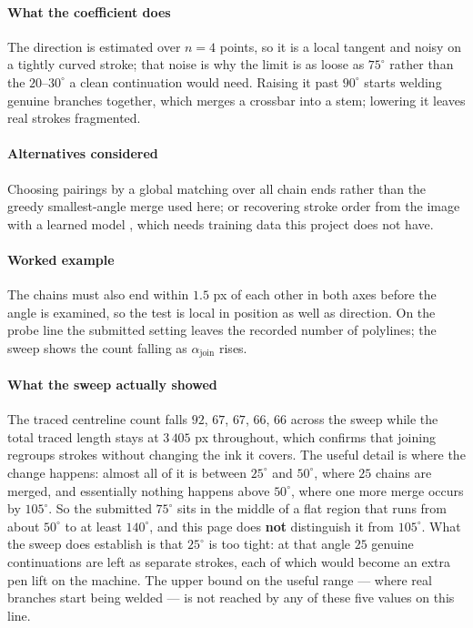 \paragraph{What the coefficient does}

The direction is estimated over $n = 4$ points, so it is a local tangent and noisy on a tightly curved stroke; that noise is why the limit is as loose as $75^\circ$ rather than the $20$--$30^\circ$ a clean continuation would need. Raising it past $90^\circ$ starts welding genuine branches together, which merges a crossbar into a stem; lowering it leaves real strokes fragmented.

\paragraph{Alternatives considered}

Choosing pairings by a global matching over all chain ends rather than the greedy smallest-angle merge used here; or recovering stroke order from the image with a learned model \cite{plamondon2000}, which needs training data this project does not have.

\paragraph{Worked example}

The chains must also end within $1.5$ px of each other in both axes before the angle is examined, so the test is local in position as well as direction. On the probe line the submitted setting leaves the recorded number of polylines; the sweep shows the count falling as $\alpha_{\text{join}}$ rises.

\paragraph{What the sweep actually showed}

The traced centreline count falls $92$, $67$, $67$, $66$, $66$ across the sweep while the total traced length stays at $3\,405$ px throughout, which confirms that joining regroups strokes without changing the ink it covers. The useful detail is where the change happens: almost all of it is between $25^\circ$ and $50^\circ$, where $25$ chains are merged, and essentially nothing happens above $50^\circ$, where one more merge occurs by $105^\circ$. So the submitted $75^\circ$ sits in the middle of a flat region that runs from about $50^\circ$ to at least $140^\circ$, and this page does \textbf{not} distinguish it from $105^\circ$. What the sweep does establish is that $25^\circ$ is too tight: at that angle $25$ genuine continuations are left as separate strokes, each of which would become an extra pen lift on the machine. The upper bound on the useful range --- where real branches start being welded --- is not reached by any of these five values on this line.

